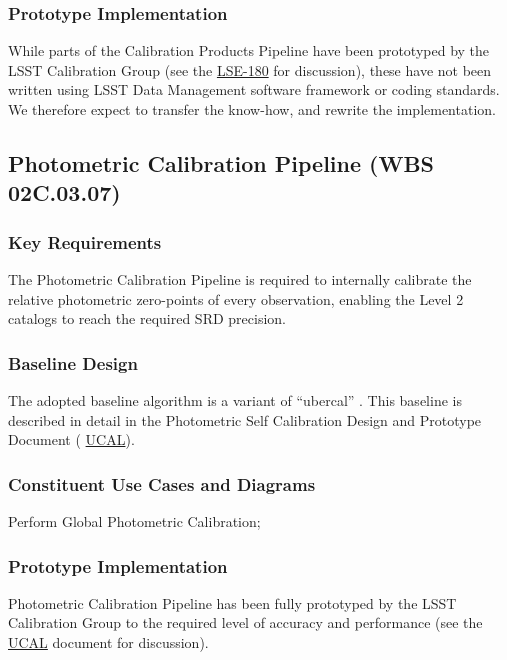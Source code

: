 \documentclass[12pt]{article}
\newcommand{\ds}[2]{{\color{blue} \href{https://docushare.lsstcorp.org/docushare/dsweb/Get/#1}{#2}}\xspace}
\newcommand{\NewPCP}{\ds{LSE-180}{LSE-180}}
\newcommand{\UCAL}{\ds{Document-15125}{UCAL}}
\newcommand{\wbsPhotoCal}{WBS 02C.03.07}
\begin{document}
\subsubsection{Prototype Implementation}

While parts of the Calibration Products Pipeline have been prototyped by the LSST Calibration Group (see the \NewPCP for discussion), these have not been written using LSST Data Management software framework or coding standards. We therefore expect to transfer the know-how, and rewrite the implementation.

\clearpage

\subsection{Photometric Calibration Pipeline (\wbsPhotoCal)}

\subsubsection{Key Requirements}

The Photometric Calibration Pipeline is required to internally calibrate the relative photometric zero-points of every observation, enabling the Level 2 catalogs to reach the required SRD precision.

\subsubsection{Baseline Design}

The adopted baseline algorithm is a variant of ``ubercal'' \cite{Padmanabhan08, Schlafly12}. This baseline is described in detail in the Photometric Self Calibration Design and Prototype Document (\UCAL).

\subsubsection{Constituent Use Cases and Diagrams}

Perform Global Photometric Calibration;

\subsubsection{Prototype Implementation}

Photometric Calibration Pipeline has been fully prototyped by the LSST Calibration Group to the required level of accuracy and performance (see the \UCAL document for discussion). %
\\
\end{document}
